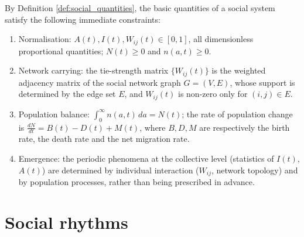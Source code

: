 \begin{property}\label{ch27_basic_constraints}
By Definition \ref{def:social_quantities}, the basic quantities of a social system satisfy the following immediate constraints:
\begin{enumerate}[label=(\roman*)]
    \item Normalisation: $A(t), I(t), W_{ij}(t) \in [0,1]$, all dimensionless proportional quantities; $N(t) \ge 0$ and $n(a, t) \ge 0$.
    \item Network carrying: the tie-strength matrix $\{W_{ij}(t)\}$ is the weighted adjacency matrix of the social network graph $G=(V,E)$, whose support is determined by the edge set $E$, and $W_{ij}(t)$ is non-zero only for $(i,j) \in E$.
    \item Population balance: $\int_0^\infty n(a,t)\, da = N(t)$; the rate of population change is $\frac{dN}{dt} = B(t) - D(t) + M(t)$, where $B, D, M$ are respectively the birth rate, the death rate and the net migration rate.
    \item Emergence: the periodic phenomena at the collective level (statistics of $I(t)$, $A(t)$) are determined by individual interaction ($W_{ij}$, network topology) and by population processes, rather than being prescribed in advance.
\end{enumerate}
\end{property}

\section{Social rhythms}

